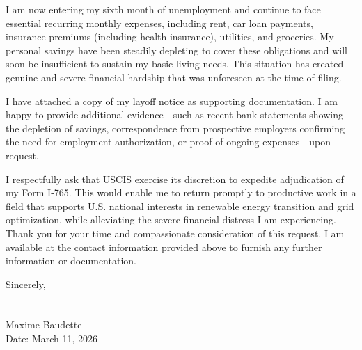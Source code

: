 \documentclass[12pt,letterpaper]{article}
\newcommand{\myFirstName}[0]{Maxime}
\newcommand{\myLastName}[0]{Baudette}
\newcommand{\letterSignature}[0]{%
\vspace{0.5cm}
Sincerely,\\
\\
\\
\myFirstName {} \myLastName \\
Date: March 11, 2026}
\begin{document}
I am now entering my sixth month of unemployment and continue to face essential recurring monthly expenses, including rent, car loan payments, insurance premiums (including health insurance), utilities, and groceries. My personal savings have been steadily depleting to cover these obligations and will soon be insufficient to sustain my basic living needs. This situation has created genuine and severe financial hardship that was unforeseen at the time of filing.

I have attached a copy of my layoff notice as supporting documentation. I am happy to provide additional evidence—such as recent bank statements showing the depletion of savings, correspondence from prospective employers confirming the need for employment authorization, or proof of ongoing expenses—upon request.

I respectfully ask that USCIS exercise its discretion to expedite adjudication of my Form I-765. This would enable me to return promptly to productive work in a field that supports U.S. national interests in renewable energy transition and grid optimization, while alleviating the severe financial distress I am experiencing.
Thank you for your time and compassionate consideration of this request. I am available at the contact information provided above to furnish any further information or documentation.

\letterSignature
\label{endOfCoverLetter}
\clearpage
\end{document}
